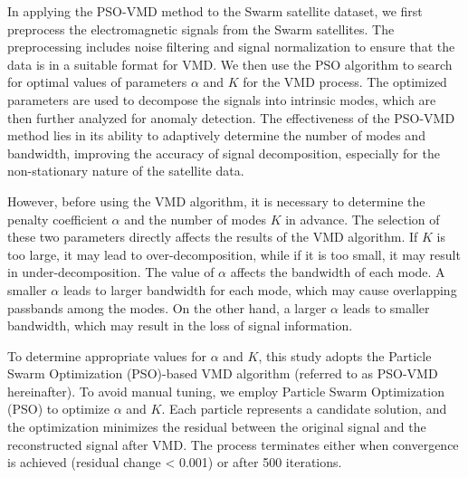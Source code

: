 \documentclass[3p,authoryear,preprint,12pt]{elsarticle}
\begin{document}
{In applying the PSO-VMD method to the Swarm satellite dataset, we first preprocess the electromagnetic signals from the Swarm satellites. The preprocessing includes noise filtering and signal normalization to ensure that the data is in a suitable format for VMD. We then use the PSO algorithm to search for optimal values of parameters $\alpha$ and $K$ for the VMD process. The optimized parameters are used to decompose the signals into intrinsic modes, which are then further analyzed for anomaly detection. The effectiveness of the PSO-VMD method lies in its ability to adaptively determine the number of modes and bandwidth, improving the accuracy of signal decomposition, especially for the non-stationary nature of the satellite data.}


{However, before using the VMD algorithm, it is necessary to determine the penalty coefficient $\alpha$ and the number of modes $K$ in advance. The selection of these two parameters directly affects the results of the VMD algorithm. If $K$ is too large, it may lead to over-decomposition, while if it is too small, it may result in under-decomposition. The value of $\alpha$ affects the bandwidth of each mode. A smaller $\alpha$ leads to larger bandwidth for each mode, which may cause overlapping passbands among the modes. On the other hand, a larger $\alpha$ leads to smaller bandwidth, which may result in the loss of signal information.}

{To determine appropriate values for $\alpha$ and $K$, this study adopts the Particle Swarm Optimization (PSO)-based VMD algorithm (referred to as PSO-VMD hereinafter). To avoid manual tuning, we employ Particle Swarm Optimization (PSO) to optimize $\alpha$ and $K$. Each particle represents a candidate solution, and the optimization minimizes the residual between the original signal and the reconstructed signal after VMD. The process terminates either when convergence is achieved (residual change < 0.001) or after 500 iterations.
}
\end{document}
